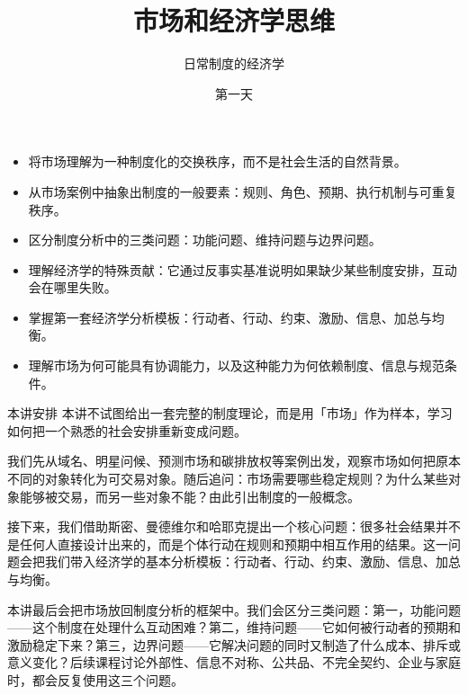 \documentclass[UTF8,10pt,a4paper,scheme=chinese]{ctexart}
\title{\vspace{-2em}\bfseries 市场和经济学思维}
\author{日常制度的经济学}
\date{第一天}
\begin{document}
\maketitle
\thispagestyle{fancy}

\begin{goalsbox}
\begin{itemize}
  \item 将市场理解为一种制度化的交换秩序，而不是社会生活的自然背景。
  \item 从市场案例中抽象出制度的一般要素：规则、角色、预期、执行机制与可重复秩序。
  \item 区分制度分析中的三类问题：功能问题、维持问题与边界问题。
  \item 理解经济学的特殊贡献：它通过反事实基准说明如果缺少某些制度安排，互动会在哪里失败。
  \item 掌握第一套经济学分析模板：行动者、行动、约束、激励、信息、加总与均衡。
  \item 理解市场为何可能具有协调能力，以及这种能力为何依赖制度、信息与规范条件。
\end{itemize}
\end{goalsbox}

\begin{keybox}{本讲安排}
本讲不试图给出一套完整的制度理论，而是用「市场」作为样本，学习如何把一个熟悉的社会安排重新变成问题。

我们先从域名、明星问候、预测市场和碳排放权等案例出发，观察市场如何把原本不同的对象转化为可交易对象。随后追问：市场需要哪些稳定规则？为什么某些对象能够被交易，而另一些对象不能？由此引出制度的一般概念。

接下来，我们借助斯密、曼德维尔和哈耶克提出一个核心问题：很多社会结果并不是任何人直接设计出来的，而是个体行动在规则和预期中相互作用的结果。这一问题会把我们带入经济学的基本分析模板：行动者、行动、约束、激励、信息、加总与均衡。

本讲最后会把市场放回制度分析的框架中。我们会区分三类问题：第一，功能问题——这个制度在处理什么互动困难？第二，维持问题——它如何被行动者的预期和激励稳定下来？第三，边界问题——它解决问题的同时又制造了什么成本、排斥或意义变化？后续课程讨论外部性、信息不对称、公共品、不完全契约、企业与家庭时，都会反复使用这三个问题。
\end{keybox}


\end{document}
